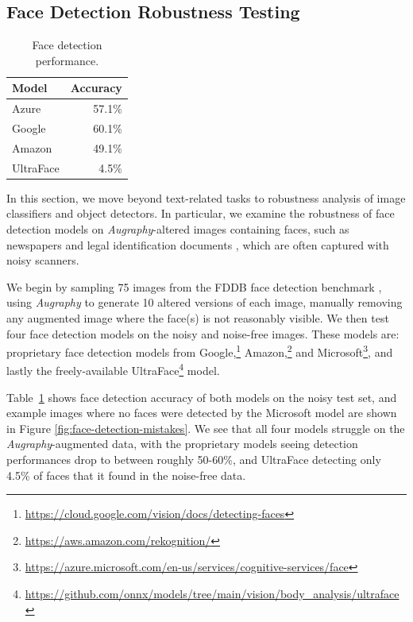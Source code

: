 \documentclass[runningheads]{llncs}
\begin{document}
\subsection{Face Detection Robustness Testing}
\begin{table}
    \centering
    \caption{Face detection performance.}
    \begin{tabular}{lr}
    \toprule
        \textbf{Model} & \textbf{Accuracy} \\
        \midrule
        Azure & 57.1\%\\
        Google & 60.1\%\\
        Amazon & 49.1\%\\
        UltraFace & 4.5\%\\
        \bottomrule
    \end{tabular}
    \label{tab:face-detection-results}
\end{table}
In this section, we move beyond text-related tasks to robustness analysis of image classifiers and object detectors. In particular, we examine the robustness of face detection models on \emph{Augraphy}-altered images containing faces, such as newspapers \cite{newspaper-navigator} and legal identification documents \cite{midv-500}, which are often captured with noisy scanners.

We begin by sampling 75 images from the FDDB face detection benchmark \cite{fddbTech}, using \emph{Augraphy} to generate 10 altered versions of each image, manually removing any augmented image where the face(s) is not reasonably visible.
We then test four face detection models on the noisy and noise-free images.
These models are: proprietary face detection models from Google,\footnote{\url{https://cloud.google.com/vision/docs/detecting-faces}} Amazon,\footnote{\url{https://aws.amazon.com/rekognition/}} and Microsoft\footnote{\url{https://azure.microsoft.com/en-us/services/cognitive-services/face}}, and lastly the freely-available UltraFace\footnote{\url{https://github.com/onnx/models/tree/main/vision/body_analysis/ultraface}} model.

Table~\ref{tab:face-detection-results} shows face detection accuracy of both models on the noisy test set, and example images where no faces were detected by the Microsoft model are shown in Figure \ref{fig:face-detection-mistakes}.
We see that all four models struggle on the \emph{Augraphy}-augmented data, with the proprietary models seeing detection performances drop to between roughly 50-60\%, and UltraFace detecting only 4.5\% of faces that it found in the noise-free data.
\end{document}
